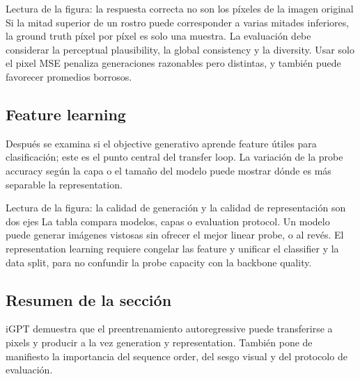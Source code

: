 
\begin{knowledgebox}{Lectura de la figura: la respuesta correcta no son los píxeles de la imagen original}
Si la mitad superior de un rostro puede corresponder a varias mitades inferiores, la ground truth píxel por píxel es solo una muestra. La evaluación debe considerar la perceptual plausibility, la global consistency y la diversity. Usar solo el pixel MSE penaliza generaciones razonables pero distintas, y también puede favorecer promedios borrosos.
\end{knowledgebox}

\subsection{Feature learning}

Después se examina si el objective generativo aprende feature útiles para clasificación; este es el punto central del transfer loop. La variación de la probe accuracy según la capa o el tamaño del modelo puede mostrar dónde es más separable la representation.


\begin{knowledgebox}{Lectura de la figura: la calidad de generación y la calidad de representación son dos ejes}
La tabla compara modelos, capas o evaluation protocol. Un modelo puede generar imágenes vistosas sin ofrecer el mejor linear probe, o al revés. El representation learning requiere congelar las feature y unificar el classifier y la data split, para no confundir la probe capacity con la backbone quality.
\end{knowledgebox}

\subsection{Resumen de la sección}

iGPT demuestra que el preentrenamiento autoregressive puede transferirse a pixels y producir a la vez generation y representation. También pone de manifiesto la importancia del sequence order, del sesgo visual y del protocolo de evaluación.
